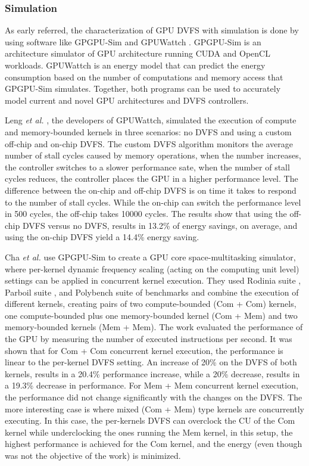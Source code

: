 \subsubsection{Simulation}

As early referred, the characterization of GPU DVFS with simulation is done by using software like GPGPU-Sim \cite{noauthor_gpgpu-sim/gpgpu-sim_distribution_2019} and GPUWattch \cite{noauthor_gpu_2011} \cite{leng_gpuwattch:_2013}. GPGPU-Sim is an architecture simulator of GPU architecture running CUDA and OpenCL workloads. GPUWattch is an energy model that can predict the energy consumption based on the number of computations and memory access that GPGPU-Sim simulates. Together, both programs can be used to accurately model current and novel GPU architectures and DVFS controllers.

Leng \textit{et al.} \cite{leng_gpuwattch:_2013}, the developers of GPUWattch, simulated the execution of compute and memory-bounded kernels in three scenarios: no DVFS and using a custom off-chip and on-chip DVFS. The custom DVFS algorithm monitors the average number of stall cycles caused by memory operations, when the number increases, the controller switches to a slower performance sate, when the number of stall cycles reduces, the controller places the GPU in a higher performance level. The difference between the on-chip and off-chip DVFS is on time it takes to respond to the number of stall cycles. While the on-chip can switch the performance level in 500 cycles, the off-chip takes 10000 cycles. The results show that using the off-chip DVFS versus no DVFS, results in 13.2\% of energy savings, on average, and using the on-chip DVFS yield a 14.4\% energy saving.

Cha \textit{et al.} \cite{cha_core-level_2018} use GPGPU-Sim to create a GPU core space-multitasking simulator, where per-kernel dynamic frequency scaling (acting on the computing unit level) settings can be applied in concurrent kernel execution. They used Rodinia suite \cite{che_rodinia:_2009}, Parboil suite \cite{stratton_parboil:_nodate}, and Polybench suite \cite{noauthor_polybench/c_nodate} of benchmarks and combine the execution of different kernels, creating pairs of two compute-bounded (Com + Com) kernels, one compute-bounded plus one memory-bounded kernel (Com + Mem) and two memory-bounded kernels (Mem + Mem). The work evaluated the performance of the GPU by measuring the number of executed instructions per second. It was shown that for Com + Com concurrent kernel execution, the performance is linear to the per-kernel DVFS setting. An increase of 20\% on the DVFS of both kernels, results in a 20.4\% performance increase, while a 20\% decrease, results in a 19.3\% decrease in performance. For Mem + Mem concurrent kernel execution, the performance did not change significantly with the changes on the DVFS. The more interesting case is where mixed (Com + Mem) type kernels are concurrently executing. In this case, the per-kernels DVFS can overclock the CU of the Com kernel while underclocking the ones running the Mem kernel, in this setup, the highest performance is achieved for the Com kernel, and the energy (even though was not the objective of the work) is minimized.

